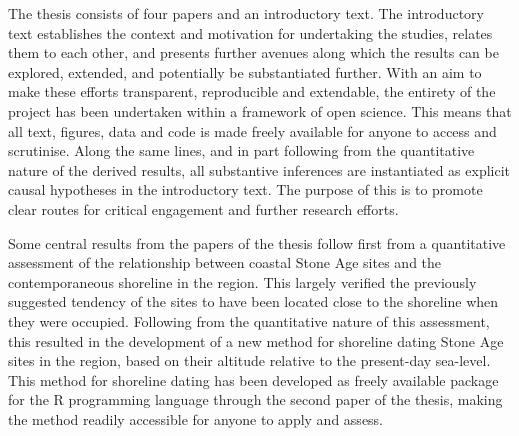 The thesis consists of four papers and an introductory text. The introductory text establishes the context and motivation for undertaking the studies, relates them to each other, and presents further avenues along which the results can be explored, extended, and potentially be substantiated further. With an aim to make these efforts transparent, reproducible and extendable, the entirety of the project has been undertaken within a framework of open science. This means that all text, figures, data and code is made freely available for anyone to access and scrutinise. Along the same lines, and in part following from the quantitative nature of the derived results, all substantive inferences are instantiated as explicit causal hypotheses in the introductory text. The purpose of this is to promote clear routes for critical engagement and further research efforts.  

Some central results from the papers of the thesis follow first from a quantitative assessment of the relationship between coastal Stone Age sites and the contemporaneous shoreline in the region. This largely verified the previously suggested tendency of the sites to have been located close to the shoreline when they were occupied. Following from the quantitative nature of this assessment, this resulted in the development of a new method for shoreline dating Stone Age sites in the region, based on their altitude relative to the present-day sea-level. This method for shoreline dating has been developed as freely available package for the R programming language through the second paper of the thesis, making the method readily accessible for anyone to apply and assess. 

